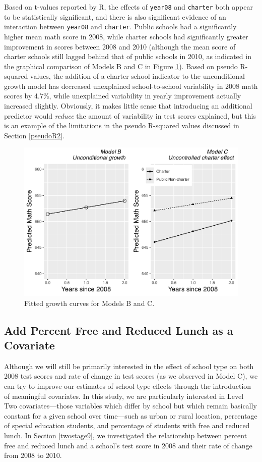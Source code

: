 \documentclass[
]{krantz}
\begin{document}
Based on t-values reported by R, the effects of \texttt{year08} and \texttt{charter} both appear to be statistically significant, and there is also significant evidence of an interaction between \texttt{year08} and \texttt{charter}. Public schools had a significantly higher mean math score in 2008, while charter schools had significantly greater improvement in scores between 2008 and 2010 (although the mean score of charter schools still lagged behind that of public schools in 2010, as indicated in the graphical comparison of Models B and C in Figure \ref{fig:lon-scat4}). Based on pseudo R-squared values, the addition of a charter school indicator to the unconditional growth model has decreased unexplained school-to-school variability in 2008 math scores by 4.7\%, while unexplained variability in yearly improvement actually increased slightly. Obviously, it makes little sense that introducing an additional predictor would \emph{reduce} the amount of variability in test scores explained, but this is an example of the limitations in the pseudo R-squared values discussed in Section \ref{pseudoR2}.

\begin{figure}

{\centering \includegraphics[width=0.6\linewidth]{bookdown-BeyondMLR_files/figure-latex/lon-scat4-1} 

}

\caption{ Fitted growth curves for Models B and C.}\label{fig:lon-scat4}
\end{figure}

\hypertarget{modeld}{%
\subsection{Add Percent Free and Reduced Lunch as a Covariate}\label{modeld}}

Although we will still be primarily interested in the effect of school type on both 2008 test scores and rate of change in test scores (as we observed in Model C), we can try to improve our estimates of school type effects through the introduction of meaningful covariates. In this study, we are particularly interested in Level Two covariates---those variables which differ by school but which remain basically constant for a given school over time---such as urban or rural location, percentage of special education students, and percentage of students with free and reduced lunch. In Section \ref{twostage9}, we investigated the relationship between percent free and reduced lunch and a school's test score in 2008 and their rate of change from 2008 to 2010.
\end{document}
